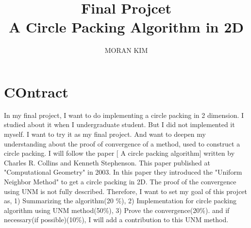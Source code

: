 \documentclass{SOP_KimMoran}
\begin{document}
\title[Final Projcet]
{Final Projcet\\ A Circle Packing Algorithm in 2D}


\author{MORAN KIM}
\address{Department of Mathematics\\
  Ewha Womans University\\South Korea}

\maketitle
\section{COntract}
In my final project, I want to do implementing a circle packing in 2 dimension. I studied about it when I undergraduate student. But I did not implemented it myself. I want to try it as my final project. And want to deepen my understanding about the proof of convergence of a method, used to construct a circle packing. I will follow the paper [ A circle packing algorithm] written by Charles R. Collins and  Kenneth Stephenson. This paper published at "Computational Geometry" in 2003. In this paper they introduced the "Uniform Neighbor Method" to get a circle packing in 2D. The proof of the convergence using UNM is not fully described. Therefore, I want to set my goal of this projcet as, 1) Summarizing the algorithm(20 \%), 2) Implementation for circle packing algorithm using UNM method(50\%), 3) Prove the convergence(20\%). and if necessary(if possible)(10\%), I will add a contribution to this UNM method.
\end{document}
